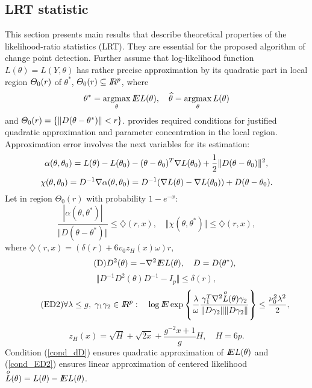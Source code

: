 \label{sec:theory}
\subsection{LRT statistic}
This section presents main results that describe theoretical properties of the likelihood-ratio statistics (LRT). They are essential for the proposed algorithm of change point detection. Further assume that log-likelihood function $L(\theta) = L(Y,\theta)$ has rather precise approximation by its quadratic part in local region $\varTheta_0(r)$  of $\theta^*$, $\varTheta_0(r) \subseteq I\!\!R^p$, where
\[
\theta^* = \argmax_{\theta} \E L(\theta),
\quad
\widehat{\theta} = \argmax_{\theta} L(\theta)
\]
and $\varTheta_0(r) = \{\Vert D (\theta - \theta^*) \Vert < r \}$. \cite{wilks2013} provides required conditions for justified quadratic approximation and parameter concentration in the local region.
Approximation error involves the next variables for its estimation:
\[
  \alpha(\theta, \theta_0) = L(\theta) - L(\theta_0)   - (\theta - \theta_0)^T \nabla L( \theta_0) +  \frac{1}{2} \Vert D (\theta - \theta_0) \Vert^2, 
\]
\[
\chi(\theta, \theta_0) = D^{-1} \nabla \alpha(\theta, \theta_0) 
= D^{-1} (\nabla L(\theta) - \nabla L( \theta_0) ) +  D (\theta - \theta_0). 
\]
Let  in region $\Theta_0(r)$ with probability $1 - e^{-x}$:
\begin{equation}\label{cond_A}\tag{A}
\frac{| \alpha(\theta, \theta^*)  |}{\Vert D(\theta - \theta^*) \Vert} \leq \diamondsuit (r, x),  
\quad
  \Vert \chi(\theta, \theta^*) \Vert \leq  \diamondsuit (r, x),
\end{equation}
where $\diamondsuit (r, x) = (\delta (r) + 6 v_0 z_H(x) \omega ) r,$
\[\tag{D}
D^2(\theta) = - \nabla^2 I\!\!E L (\theta),
\quad
D = D(\theta^*),
\]
\begin{equation}\label{cond_dD}\tag{dD}
\Vert D^{-1} D^2(\theta) D^{-1} - I_p\Vert \leq \delta(r),
\end{equation}
\begin{equation}\label{cond_ED2}\tag{ED2}
\forall \lambda \leq g, \; \gamma_1 \gamma_2 \in I\!\!R^p: \quad
\log I\!\!E \exp \left\{
\frac{\lambda}{\omega} \frac{\gamma_1^T \nabla^2 \overset{o}{L}(\theta) \gamma_2}{\Vert D \gamma_2 \Vert \Vert D \gamma_2 \Vert}
\right\} \leq 
\frac{\nu_0^2 \lambda^2}{2},
\end{equation}
\[
z_H(x) = \sqrt{H} + \sqrt{2x} + \frac{g^{-2} x + 1}{g} H, 
\quad H = 6p.
\]
Condition (\ref{cond_dD}) ensures quadratic approximation of $I\!\!E L(\theta)$ and (\ref{cond_ED2}) ensures linear approximation of centered likelihood $\overset{o}{L}(\theta) = L(\theta) - I\!\!E L(\theta)$.  

